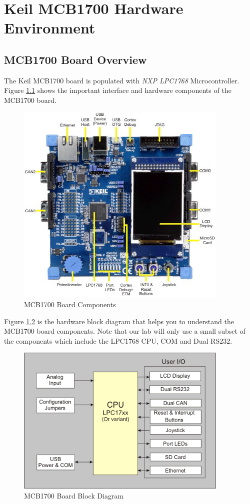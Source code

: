 \chapter{Keil MCB1700 Hardware Environment}
\label{ch_keil_hardware}
\section{MCB1700 Board Overview}
The Keil MCB1700 board is populated with {\em NXP LPC1768} Microcontroller. Figure \ref{fig_board_components} shows the important interface and hardware components of the MCB1700 board. 


\begin{figure}
\centerline{\includegraphics[width=4in]{figure/MCB1700_Board_Components}}
\caption[MCB1700 Board Components] {MCB1700 Board Components \cite{keil.mcb1700.guide}}
\label{fig_board_components}
\end{figure}
Figure \ref{fig_board_block} is the hardware block diagram that helps you to understand the MCB1700 board components. Note that our lab will only use a small subset of the components which include the LPC1768 CPU, COM and Dual RS232. 
\begin{figure}
\centerline{\includegraphics[width=4in]{figure/mcb1700_block_diagram}}
\caption[MCB1700 Board Block Diagram] {MCB1700 Board Block Diagram \cite{keil.mcb1700.guide}}
\label{fig_board_block}
\end{figure}

